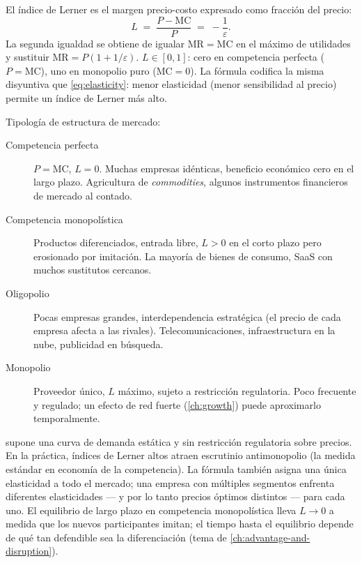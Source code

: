 El índice de Lerner es el margen precio-costo expresado como fracción del precio:
\begin{equation}\label{eq:lerner}
  L \;=\; \frac{P - \mathrm{MC}}{P} \;=\; -\frac{1}{\varepsilon}.
\end{equation}
La segunda igualdad se obtiene de igualar \(\mathrm{MR}=\mathrm{MC}\) en el máximo de utilidades y
sustituir \(\mathrm{MR}=P(1+1/\varepsilon)\). \(L\in[0,1]\): cero en competencia perfecta
(\(P=\mathrm{MC}\)), uno en monopolio puro (\(\mathrm{MC}=0\)). La fórmula codifica la misma
disyuntiva que \cref{eq:elasticity}: menor elasticidad (menor sensibilidad al precio) permite un
índice de Lerner más alto.

Tipología de estructura de mercado:
\begin{description}
  \item[Competencia perfecta] \(P=\mathrm{MC}\), \(L=0\). Muchas empresas idénticas, beneficio
    económico cero en el largo plazo. Agricultura de \emph{commodities}, algunos instrumentos
    financieros de mercado al contado.
  \item[Competencia monopolística] Productos diferenciados, entrada libre, \(L>0\) en el corto plazo
    pero erosionado por imitación. La mayoría de bienes de consumo, SaaS con muchos sustitutos
    cercanos.
  \item[Oligopolio] Pocas empresas grandes, interdependencia estratégica (el precio de cada empresa
    afecta a las rivales). Telecomunicaciones, infraestructura en la nube, publicidad en búsqueda.
  \item[Monopolio] Proveedor único, \(L\) máximo, sujeto a restricción regulatoria. Poco frecuente
    y regulado; un efecto de red fuerte (\cref{ch:growth}) puede aproximarlo temporalmente.
\end{description}

 supone una curva de demanda estática y sin restricción regulatoria sobre precios.
En la práctica, índices de Lerner altos atraen escrutinio antimonopolio (la medida estándar en
economía de la competencia). La fórmula también asigna una única elasticidad a todo el mercado;
una empresa con múltiples segmentos enfrenta diferentes elasticidades --- y por lo tanto precios
óptimos distintos --- para cada uno. El equilibrio de largo plazo en competencia monopolística
lleva \(L\to 0\) a medida que los nuevos participantes imitan; el tiempo hasta el equilibrio depende
de qué tan defendible sea la diferenciación (tema de \cref{ch:advantage-and-disruption}).

